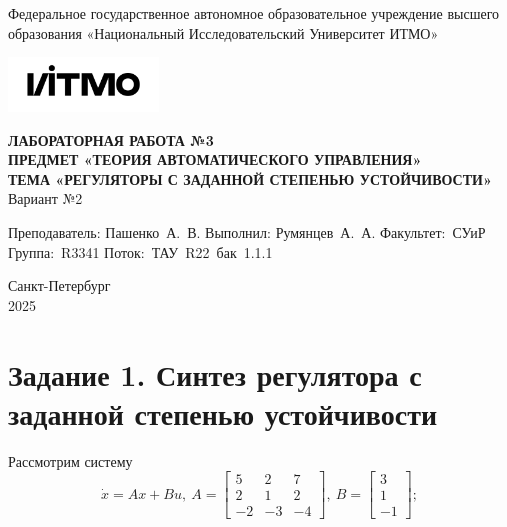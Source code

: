 \documentclass[a4paper, 12pt]{article}
\begin{document}
    \begin{titlepage}

        \begin{center}
        Федеральное государственное автономное образовательное учреждение высшего образования
        «Национальный Исследовательский Университет ИТМО»
        \vfill
        
        \includegraphics[width=0.3\textwidth]{itmo.png} %

        {\large\bf ЛАБОРАТОРНАЯ РАБОТА №3}\\
        {\large\bf ПРЕДМЕТ «ТЕОРИЯ АВТОМАТИЧЕСКОГО УПРАВЛЕНИЯ»}\\
        {\large\bf ТЕМА «РЕГУЛЯТОРЫ С ЗАДАННОЙ СТЕПЕНЬЮ УСТОЙЧИВОСТИ»}\\
        Вариант №2
        \vfill

        \begin{flushright}
            \begin{minipage}{.45\textwidth}
            {
                \hbox{Преподаватель:}
                \hbox{Пашенко А. В.}
                \hbox{}
                \hbox{Выполнил:}
                \hbox{Румянцев А. А.}
                \hbox{}
                \hbox{Факультет: СУиР}
                \hbox{Группа: R3341}
                \hbox{Поток: ТАУ R22 бак 1.1.1}
            }
            \end{minipage}
        \end{flushright}
        \vfill
  
        Санкт-Петербург\\
        2025
        \end{center}
    \end{titlepage}
    
    \tableofcontents

    \newpage
    \section{Задание 1. Синтез регулятора с заданной степенью устойчивости}
    Рассмотрим систему
    $$
    \dot{x}=Ax+Bu,\ A=\begin{bmatrix}
        5 &2 &7\\
        2 &1 &2\\
        -2 &-3 &-4
    \end{bmatrix},\ B=\begin{bmatrix}
        3\\1\\-1
    \end{bmatrix};
    $$
\end{document}
